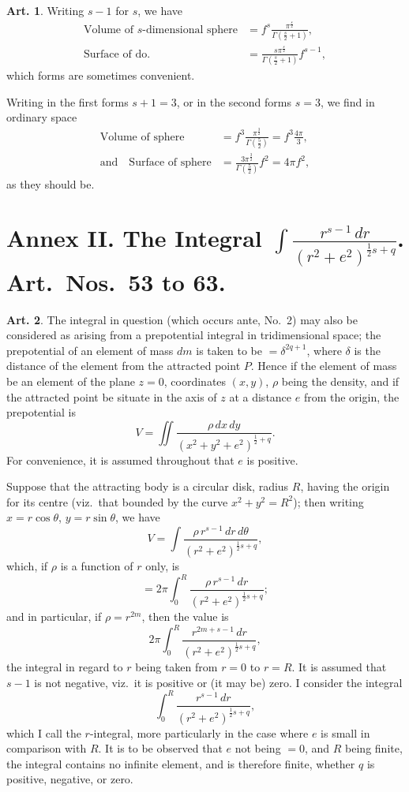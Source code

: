 \documentclass[12pt,a4paper]{article}
\theoremstyle{definition}
\newtheorem{art}{Art.}[section]
\begin{document}
\begin{art}\label{art:52}
Writing $s-1$ for $s$, we have
\begin{align*}
\text{Volume of $s$-dimensional sphere} &= f^s \frac{\pi^{\frac{s}{2}}}{\Gamma(\frac{s}{2} + 1)}, \\
\text{Surface of do.} &= \frac{s\pi^{\frac{s}{2}}}{\Gamma(\frac{s}{2} + 1)} f^{s-1},
\end{align*}
which forms are sometimes convenient.

Writing in the first forms $s+1 = 3$, or in the second forms $s = 3$, we find in ordinary space
\begin{align*}
\text{Volume of sphere} &= f^3 \frac{\pi^{\frac{3}{2}}}{\Gamma(\frac{5}{2})} = f^3 \frac{4\pi}{3}, \\
\text{and} \quad \text{Surface of sphere} &= \frac{3\pi^{\frac{3}{2}}}{\Gamma(\frac{5}{2})} f^2 = 4\pi f^2,
\end{align*}
as they should be.
\end{art}

\section*{Annex II. The Integral $\displaystyle\int \frac{r^{s-1}\,dr}{(r^2 + e^2)^{\frac{1}{2}s+q}}$. Art.\ Nos.\ 53 to 63.}

\begin{art}\label{art:53}
The integral in question (which occurs ante, No.\ 2) may also be considered as arising from a prepotential integral in tridimensional space; the prepotential of an element of mass $dm$ is taken to be $= \delta^{2q+1}$, where $\delta$ is the distance of the element from the attracted point $P$. Hence if the element of mass be an element of the plane $z = 0$, coordinates $(x, y)$, $\rho$ being the density, and if the attracted point be situate in the axis of $z$ at a distance $e$ from the origin, the prepotential is
\[
V = \iint \frac{\rho \, dx \, dy}{(x^2 + y^2 + e^2)^{\frac{1}{2}+q}}.
\]
For convenience, it is assumed throughout that $e$ is positive.

Suppose that the attracting body is a circular disk, radius $R$, having the origin for its centre (viz.\ that bounded by the curve $x^2 + y^2 = R^2$); then writing $x = r\cos\theta$, $y = r\sin\theta$, we have
\[
V = \int \frac{\rho \, r^{s-1} \, dr \, d\theta}{(r^2 + e^2)^{\frac{1}{2}s+q}},
\]
which, if $\rho$ is a function of $r$ only, is
\[
= 2\pi \int_0^R \frac{\rho \, r^{s-1} \, dr}{(r^2 + e^2)^{\frac{1}{2}s+q}};
\]
and in particular, if $\rho = r^{2m}$, then the value is
\[
2\pi \int_0^R \frac{r^{2m+s-1} \, dr}{(r^2 + e^2)^{\frac{1}{2}s+q}},
\]
the integral in regard to $r$ being taken from $r = 0$ to $r = R$. It is assumed that $s-1$ is not negative, viz.\ it is positive or (it may be) zero. I consider the integral
\[
\int_0^R \frac{r^{s-1} \, dr}{(r^2 + e^2)^{\frac{1}{2}s+q}},
\]
which I call the $r$-integral, more particularly in the case where $e$ is small in comparison with $R$. It is to be observed that $e$ not being $= 0$, and $R$ being finite, the integral contains no infinite element, and is therefore finite, whether $q$ is positive, negative, or zero.
\end{art}
\end{document}
